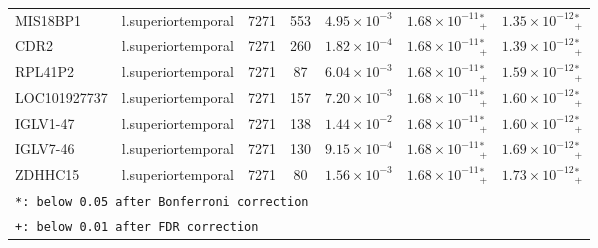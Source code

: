 \begin{tabular}{llcclll}
  MIS18BP1 & l.superiortemporal & 7271 &  553 & $4.95 \times {10^{-3}}$ & $1.68 \times {10^{-11}}{_+^*}$ & $1.35 \times {10^{-12}}{_+^*}$ \\ 
  CDR2 & l.superiortemporal & 7271 &  260 & $1.82 \times {10^{-4}}$ & $1.68 \times {10^{-11}}{_+^*}$ & $1.39 \times {10^{-12}}{_+^*}$ \\ 
  RPL41P2 & l.superiortemporal & 7271 &   87 & $6.04 \times {10^{-3}}$ & $1.68 \times {10^{-11}}{_+^*}$ & $1.59 \times {10^{-12}}{_+^*}$ \\ 
  LOC101927737 & l.superiortemporal & 7271 &  157 & $7.20 \times {10^{-3}}$ & $1.68 \times {10^{-11}}{_+^*}$ & $1.60 \times {10^{-12}}{_+^*}$ \\ 
  IGLV1-47 & l.superiortemporal & 7271 &  138 & $1.44 \times {10^{-2}}$ & $1.68 \times {10^{-11}}{_+^*}$ & $1.60 \times {10^{-12}}{_+^*}$ \\ 
  IGLV7-46 & l.superiortemporal & 7271 &  130 & $9.15 \times {10^{-4}}$ & $1.68 \times {10^{-11}}{_+^*}$ & $1.69 \times {10^{-12}}{_+^*}$ \\ 
  ZDHHC15 & l.superiortemporal & 7271 &   80 & $1.56 \times {10^{-3}}$ & $1.68 \times {10^{-11}}{_+^*}$ & $1.73 \times {10^{-12}}{_+^*}$ \\ 
  \hline
  \multicolumn{7}{l}{\texttt{*: below 0.05 after Bonferroni correction}} \\ 

  \multicolumn{7}{l}{\texttt{+: below 0.01 after FDR correction}}        \\ \hline
\end{tabular}
